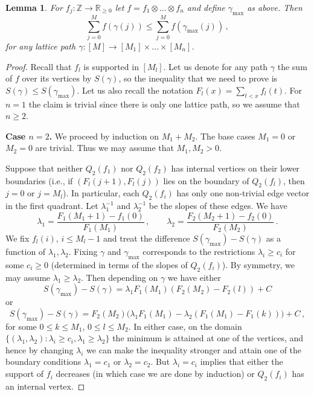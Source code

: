\documentclass[a4paper,reqno,12pt]{amsart}
\newtheorem{lemma}[theorem]{Lemma}
\newcommand{\z}{\mathbb{Z}}
\renewcommand{\r}{\mathbb{R}}
\newcommand{\1}{\bo{1}}
\begin{document}
\begin{lemma} \label{lem:mixedvolumegreater}
	For $f_j\colon\z\to\r_{\ge0}$ let $f=f_1\otimes \dots\otimes f_n$ and define $\gamma_{\mathrm{max}}$ as above. Then
	\[\sum_{j=0}^{M}f(\gamma(j)) \le \sum_{j=0}^{M}f(\gamma_{\mathrm{max}}(j))\,,\]
	for any lattice path $\gamma\colon[M]\to [M_1]\times \dots \times [M_n]$.
\end{lemma}
\begin{proof}
Recall that $f_l$ is supported in $[M_l]$. Let us denote for any path $\gamma$ the sum of $f$ over its vertices by $S(\gamma)$, so the inequality that we need to prove is $S(\gamma)\le S(\gamma_{\mathrm{max}})$. Let us also recall the notation $F_l(x)=\sum_{t<x}f_l(t)$. For $n=1$ the claim is trivial since there is only one lattice path, so we assume that $n\ge2$.
	
\noindent\textbf{Case $n=2$.} We proceed by induction on $M_1+M_2$. The base cases $M_1=0$ or $M_2=0$ are trivial. Thus we may assume that $M_1,M_2>0$.

Suppose that neither $Q_2(f_1)$ nor $Q_2(f_2)$ has internal vertices on their lower boundaries (i.e., if $(F_l(j+1),F_l(j))$ lies on the boundary of $Q_2(f_l)$, then $j=0$ or $j=M_l$). In particular, each $Q_2(f_i)$ has only one non-trivial edge vector in the first quadrant. Let $\lambda_1^{-1}$ and $\lambda_2^{-1}$ be the slopes of these edges. We have
	\[\lambda_1=\frac{F_1(M_1+1)-f_1(0)}{F_1(M_1)}\,, \qquad
	  \lambda_2=\frac{F_2(M_2+1)-f_2(0)}{F_2(M_2)}\,.\]
We fix $f_l(i)$, $i\le M_l-1$ and treat the difference $S(\gamma_{\mathrm{max}}) - S(\gamma)$ as a function of $\lambda_1,\lambda_2$. Fixing $\gamma$ and $\gamma_{\mathrm{max}}$ corresponds to the restrictions $\lambda_i\ge c_i$ for some $c_i\ge0$ (determined in terms of the slopes of $Q_2(f_i)$). By symmetry, we may assume $\lambda_1 \ge \lambda_2$. Then depending on $\gamma$ we have either
	\[S(\gamma_{\mathrm{max}}) - S(\gamma) = \lambda_1F_1(M_1)(F_2(M_2)-F_2(l))+C\]
or 
	\[S(\gamma_{\mathrm{max}}) - S(\gamma) = F_2(M_2)\Big(\lambda_1F_1(M_1) - \lambda_2(F_1(M_1)-F_1(k))\Big)+C\,,\]
for some $0\le k\le M_1$, $0\le l \le M_2$. In either case, on the domain $\{(\lambda_1,\lambda_2)\colon \lambda_i\ge c_i, \lambda_1\ge \lambda_2\}$ the minimum is attained at one of the vertices, and hence by changing $\lambda_i$ we can make the inequality stronger and attain one of the boundary conditions $\lambda_1=c_1$ or $\lambda_2=c_2$. But $\lambda_i=c_i$ implies that either the support of $f_i$ decreases (in which case we are done by induction) or $Q_2(f_i)$ has an internal vertex.


\end{proof}
\end{document}
